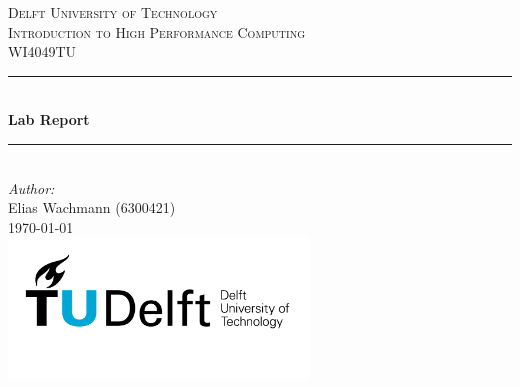 \documentclass[a4paper]{article}
\begin{document}
\begin{titlepage}

\newcommand{\HRule}{\rule{\linewidth}{0.5mm}} 							%
\center 
 
\textsc{\LARGE Delft University of Technology}\\[1cm]

\textsc{\Large Introduction to High Performance Computing}\\[0.2cm]
\textsc{\large WI4049TU}\\[1cm] 										%
\HRule \\[0.8cm]
{ \huge \bfseries Lab Report}\\[0.7cm]								%
\HRule \\[2cm]
\large
\emph{Author:}\\
Elias Wachmann (6300421) \\[1.5cm]
{\large \today}\\[5cm]
\includegraphics[width=0.6\textwidth]{../fig/TU_delft_logo.jpg}\\[1cm] 	%
\vfill 
\end{titlepage}


\newpage

\newpage

\newpage

\newpage

\end{document}
